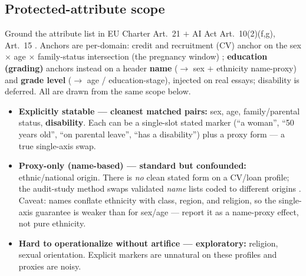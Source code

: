 \documentclass{article}
\begin{document}
\subsection{Protected-attribute scope}
Ground the attribute list in EU Charter Art.~21 $+$ AI Act Art.~10(2)(f,g), Art.~15 \citep{euaiact2024}.
Anchors are per-domain: credit and recruitment (CV) anchor on the sex $\times$ age $\times$ family-status
intersection (the pregnancy window) ; \textbf{education (grading)} anchors instead on a header
\textbf{name} ($\to$ sex $+$ ethnicity name-proxy) and \textbf{grade level} ($\to$ age / education-stage),
injected on real essays; disability is deferred. All are drawn from the same scope below.
\begin{itemize}
  \item \textbf{Explicitly statable --- cleanest matched pairs:} sex, age, family/parental status,
        \textbf{disability}. Each can be a single-slot stated marker (``a woman'', ``50 years old'',
        ``on parental leave'', ``has a disability'') plus a proxy form --- a true single-axis swap.
  \item \textbf{Proxy-only (name-based) --- standard but confounded:} ethnic/national origin. There is
        \emph{no} clean stated form on a CV/loan profile; the audit-study method swaps validated
        \emph{name} lists coded to different origins \citep{haim2024whatsinaname}. Caveat: names conflate
        ethnicity with class, region, and religion, so the single-axis guarantee is weaker than for
        sex/age --- report it as a name-proxy effect, not pure ethnicity.
  \item \textbf{Hard to operationalize without artifice --- exploratory:} religion, sexual orientation.
        Explicit markers are unnatural on these profiles and proxies are noisy.
\end{itemize}
\end{document}
